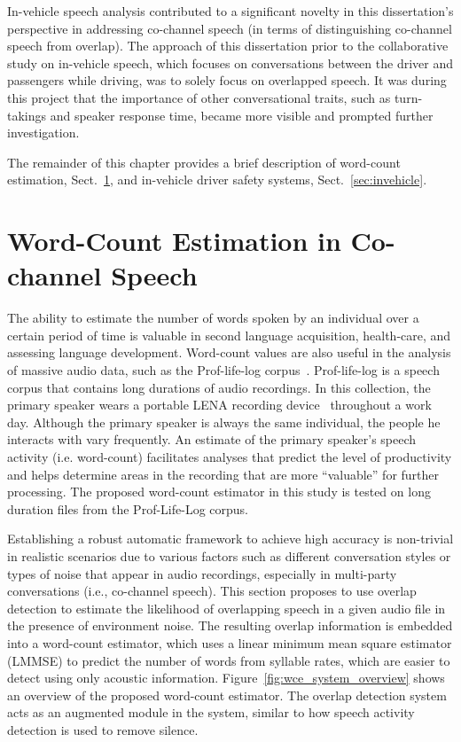 In-vehicle speech analysis contributed to a significant novelty in this dissertation's perspective in addressing co-channel speech (in terms of distinguishing co-channel speech from overlap). 
The approach of this dissertation prior to the collaborative study on in-vehicle speech, which focuses on conversations between the driver and passengers while driving, was to solely focus on overlapped speech. 
It was during this project that the importance of other conversational traits, such as turn-takings and speaker response time, became more visible and prompted further investigation. 

The remainder of this chapter provides a brief description of word-count estimation, Sect.~\ref{sec:wce_cch}, and in-vehicle driver safety systems, Sect.~\ref{sec:invehicle}. 


\section{Word-Count Estimation in Co-channel Speech}
\label{sec:wce_cch}
The ability to estimate the number of words spoken by an individual over a certain period of time is valuable in second language acquisition, health-care, and assessing language development. 
Word-count values are also useful in the analysis of massive audio data, such as the Prof-life-log corpus~\cite{ziaei2013prof}. 
Prof-life-log is a speech corpus that contains long durations of audio recordings. In this collection, the primary speaker wears a portable LENA recording device~\cite{lena_device} throughout a work day. 
Although the primary speaker is always the same individual, the people he interacts with vary frequently. 
An estimate of the primary speaker's speech activity (i.e. word-count) facilitates analyses that predict the level of productivity and helps determine areas in the recording that are more ``valuable'' for further processing. 
The proposed word-count estimator in this study is tested on long duration files from the Prof-Life-Log corpus. 

Establishing a robust automatic framework to achieve high accuracy is non-trivial in realistic scenarios due to various factors such as different conversation styles or types of noise that appear in audio recordings, especially in multi-party conversations (i.e., co-channel speech). 
This section proposes to use overlap detection to estimate the likelihood of overlapping speech in a given audio file in the presence of environment noise. 
The resulting overlap information is embedded into a word-count estimator, which uses a linear minimum mean square estimator (LMMSE) to predict the number of words from syllable rates, which are easier to detect using only acoustic information. 
Figure~\ref{fig:wce_system_overview} shows an overview of the proposed word-count estimator. 
The overlap detection system acts as an augmented module in the system, similar to how speech activity detection is used to remove silence. 

